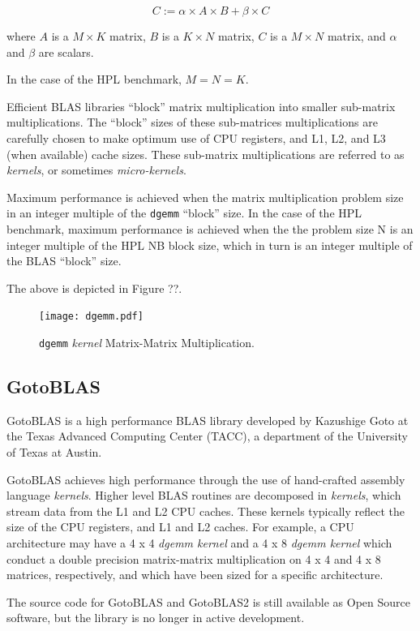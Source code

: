 \documentclass{report}
\begin{document}
\[C := \alpha \times A \times B + \beta \times C\]

where $A$ is a $M \times K$ matrix, $B$ is a $K \times N$ matrix, $C$ is a $M \times N$ matrix, and $\alpha$ and $\beta$ are scalars.

In the case of the HPL benchmark, $M = N = K$.

Efficient BLAS libraries ``block'' matrix multiplication into smaller sub-matrix multiplications. The ``block'' sizes of these sub-matrices multiplications are carefully chosen to make optimum use of CPU registers, and L1, L2, and L3 (when available) cache sizes. These sub-matrix multiplications are referred to as \emph{kernels}, or sometimes \emph{micro-kernels}.

Maximum performance is achieved when the matrix multiplication problem size in an integer multiple of the \verb|dgemm| ``block'' size. In the case of the HPL benchmark, maximum performance is achieved when the the problem size N is an integer multiple of the HPL NB block size, which in turn is an integer multiple of the BLAS ``block'' size.

The above is depicted in Figure ??.

\begin{figure}
	\centering
	\texttt{[image: dgemm.pdf]}
	\caption{\texttt{dgemm} \emph{kernel} Matrix-Matrix Multiplication.}
	\label{fig:image2}
\end{figure}


%
%
\subsection{GotoBLAS}

GotoBLAS is a high performance BLAS library developed by Kazushige Goto at the Texas Advanced Computing Center (TACC), a department of the University of Texas at Austin.

GotoBLAS achieves high performance through the use of hand-crafted assembly language \emph{kernels}. Higher level BLAS routines are decomposed in \emph{kernels}, which stream data from the L1 and L2 CPU caches. These kernels typically reflect the size of the CPU registers, and L1 and L2 caches. For example, a CPU architecture may have a 4 x 4 \emph{dgemm kernel} and a 4 x 8 \emph{dgemm kernel} which conduct a double precision matrix-matrix multiplication on 4 x 4 and 4 x 8 matrices, respectively, and which have been sized for a specific architecture.

The source code for GotoBLAS and GotoBLAS2 is still available as Open Source software, but the library is no longer in active development.
\end{document}
